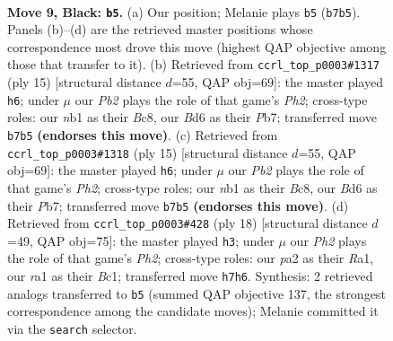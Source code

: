 \documentclass[11pt]{article}
\begin{document}
\clearpage

\begin{figure}[p]\centering
\begin{subfigure}{0.46\textwidth}\centering
\resizebox{\linewidth}{!}{%
\newchessgame
\chessboard[
  setfen={rnbq1rk1/pp4pp/2pb1n2/3p1pB1/3P4/5NP1/PPQ1PPBP/RN3RK1 b - - 3 9},
  showmover=false,
  pgfstyle=straightmove, color=movearrow, markmove={b7-b5}
]}
\caption{}
\end{subfigure}\hfill
\begin{subfigure}{0.46\textwidth}\centering
\resizebox{\linewidth}{!}{%
\newchessgame
\chessboard[
  setfen={rnbq1rk1/1pp2ppp/4pn2/p5B1/1bpP4/5NP1/PP2PPBP/RN1Q1RK1 b - - 3 8},
  showmover=false,
  pgfstyle=straightmove, color=movearrow, markmove={h7-h6}
]}
\caption{}
\end{subfigure}
\\[4pt]
\begin{subfigure}{0.46\textwidth}\centering
\resizebox{\linewidth}{!}{%
\newchessgame
\chessboard[
  setfen={rnbq1rk1/1pp2ppp/4pn2/p5B1/1bpP4/5NP1/PP2PPBP/RN1Q1RK1 b - - 3 8},
  showmover=false,
  pgfstyle=straightmove, color=movearrow, markmove={h7-h6}
]}
\caption{}
\end{subfigure}\hfill
\begin{subfigure}{0.46\textwidth}\centering
\resizebox{\linewidth}{!}{%
\newchessgame
\chessboard[
  setfen={rn1q1rk1/pp2ppbp/5np1/2p5/2PP2b1/2N1PNP1/PP4BP/R1BQ1RK1 w - - 5 10},
  showmover=false,
  pgfstyle=straightmove, color=movearrow, markmove={h2-h3}
]}
\caption{}
\end{subfigure}
\caption{\textbf{Move 9, Black: \texttt{b5}.} (a) Our position; Melanie plays \texttt{b5} (\texttt{b7b5}). Panels (b)--(d) are the retrieved master positions whose correspondence most drove this move (highest QAP objective among those that transfer to it). (b) Retrieved from \texttt{ccrl\_top\_p0003\#1317} (ply 15) [structural distance $d$=55, QAP obj=69]: the master played \texttt{h6}; under $\mu$ our \emph{Pb2} plays the role of that game's \emph{Ph2}; cross-type roles: our \emph{n}b1 as their \emph{B}c8, our \emph{B}d6 as their \emph{P}b7; transferred move \texttt{b7b5} \textbf{(endorses this move)}. (c) Retrieved from \texttt{ccrl\_top\_p0003\#1318} (ply 15) [structural distance $d$=55, QAP obj=69]: the master played \texttt{h6}; under $\mu$ our \emph{Pb2} plays the role of that game's \emph{Ph2}; cross-type roles: our \emph{n}b1 as their \emph{B}c8, our \emph{B}d6 as their \emph{P}b7; transferred move \texttt{b7b5} \textbf{(endorses this move)}. (d) Retrieved from \texttt{ccrl\_top\_p0003\#428} (ply 18) [structural distance $d$=49, QAP obj=75]: the master played \texttt{h3}; under $\mu$ our \emph{Ph2} plays the role of that game's \emph{Ph2}; cross-type roles: our \emph{p}a2 as their \emph{R}a1, our \emph{r}a1 as their \emph{B}c1; transferred move \texttt{h7h6}. Synthesis: 2 retrieved analogs transferred to \texttt{b5} (summed QAP objective 137, the strongest correspondence among the candidate moves); Melanie committed it via the \texttt{search} selector.}
\label{fig:thought-m17}
\end{figure}
\end{document}
